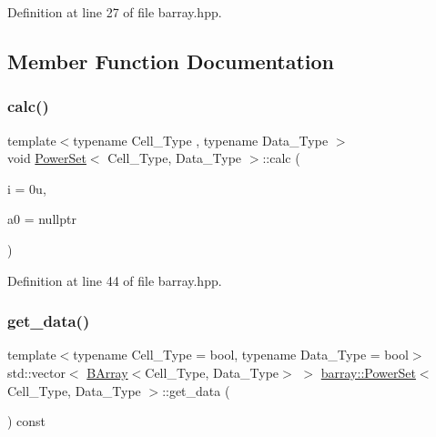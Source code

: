 Definition at line 27 of file barray.\+hpp.



\subsection{Member Function Documentation}
\mbox{\label{classbarray_1_1_power_set_a93e31ba8891642db6ecf0fca82c71f6a}} 
\subsubsection{\texorpdfstring{calc()}{calc()}}
{\footnotesize\ttfamily template$<$typename Cell\+\_\+\+Type , typename Data\+\_\+\+Type $>$ \\
void \hyperlink{classbarray_1_1_power_set}{Power\+Set}$<$ Cell\+\_\+\+Type, Data\+\_\+\+Type $>$\+::calc (\begin{DoxyParamCaption}\item[{\hyperlink{namespacebarray_af9756a31953db233f80a9cfe1ef31c32}{uint}}]{i = {\ttfamily 0u},  }\item[{\hyperlink{classbarray_1_1_b_array}{B\+Array}$<$ Cell\+\_\+\+Type, Data\+\_\+\+Type $>$ $\ast$}]{a0 = {\ttfamily nullptr} }\end{DoxyParamCaption})\hspace{0.3cm}{\ttfamily [inline]}}



Definition at line 44 of file barray.\+hpp.

\mbox{\label{classbarray_1_1_power_set_a22265b4a46c95e35f8739d076d5763ba}} 
\subsubsection{\texorpdfstring{get\+\_\+data()}{get\_data()}}
{\footnotesize\ttfamily template$<$typename Cell\+\_\+\+Type  = bool, typename Data\+\_\+\+Type  = bool$>$ \\
std\+::vector$<$ \hyperlink{classbarray_1_1_b_array}{B\+Array}$<$Cell\+\_\+\+Type, Data\+\_\+\+Type$>$ $>$ \hyperlink{classbarray_1_1_power_set}{barray\+::\+Power\+Set}$<$ Cell\+\_\+\+Type, Data\+\_\+\+Type $>$\+::get\+\_\+data (\begin{DoxyParamCaption}{ }\end{DoxyParamCaption}) const\hspace{0.3cm}{\ttfamily [inline]}}



